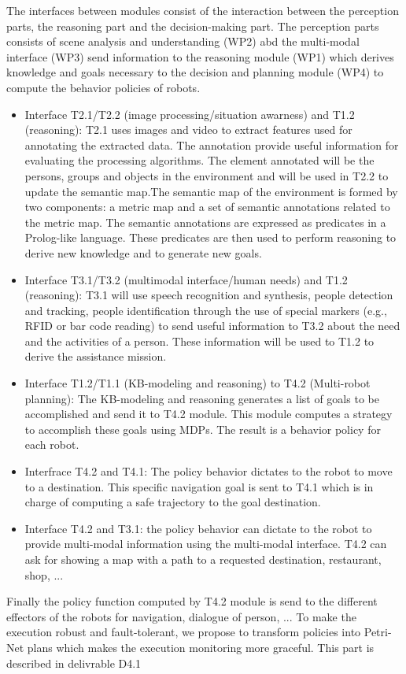 \documentclass{article}
\begin{document}
The interfaces between modules consist of the interaction between the perception parts, the reasoning part and the decision-making part. The perception parts consists of scene analysis and understanding (WP2) abd the multi-modal interface (WP3) send information to the reasoning module (WP1) which derives knowledge and goals necessary to the decision and planning module (WP4) to compute the behavior policies of robots. 
\begin{itemize}
\item Interface T2.1/T2.2 (image processing/situation awarness) and T1.2 (reasoning): T2.1 uses images and video to extract features used for annotating the extracted data. The annotation provide useful information for evaluating the processing algorithms. The element annotated will be the persons, groups and objects in the environment and will be used  in T2.2 to update the semantic map.The semantic map of the environment is formed by two components: a metric map and a set of semantic annotations related to the metric map. The semantic annotations are expressed as predicates in a Prolog-like language. These predicates are then used to perform reasoning to derive new knowledge and to generate new goals.
\item Interface T3.1/T3.2 (multimodal interface/human needs) and T1.2 (reasoning): T3.1 will use speech recognition and synthesis, people detection and tracking, people identification through the use of special markers (e.g., RFID or bar code reading) to send useful information to T3.2 about the need and the activities of a person. These information will be used to T1.2 to derive the assistance mission. 
\item Interface T1.2/T1.1 (KB-modeling and reasoning) to T4.2 (Multi-robot planning): The KB-modeling and reasoning generates a list of goals to be accomplished and send it to T4.2 module. This module computes a strategy to accomplish these goals using MDPs. The result is a behavior policy for each robot. 
\item Interfrace T4.2 and T4.1: The policy behavior dictates to the robot to move to a destination. This specific navigation goal is sent to T4.1 which is in charge of computing a safe trajectory to the goal destination. 
\item Interface T4.2 and T3.1: the policy behavior can dictate to the robot to provide multi-modal information using the multi-modal interface. T4.2 can ask for showing a map with a path to a requested destination, restaurant, shop, ...
\end{itemize}
 Finally the policy function computed by T4.2 module is send to the different effectors of the robots for navigation, dialogue of person, ... To make the execution robust and fault-tolerant, we propose to transform policies into Petri-Net plans which makes the execution monitoring more graceful. This part is described in delivrable D4.1
\end{document}
